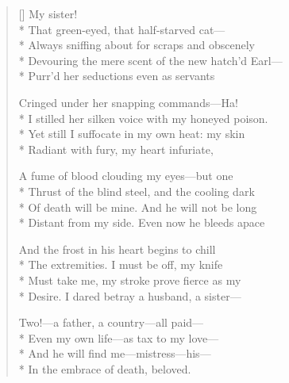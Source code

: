 \label{ch:lear_bm}
\settowidth{\versewidth}{Devouring the mere scent of the new hatch'd Earl---}
\begin{verse}[\versewidth]
\qquad \qquad My sister!\\*
That green-eyed, that half-starved cat---\\*
Always sniffing about for scraps and obscenely\\*
Devouring the mere scent of the new hatch'd Earl---\\*
Purr'd her seductions even as servants

Cringed under her snapping commands---Ha!\\*
I stilled her silken voice with my honeyed poison.\\*
Yet still I suffocate in my own heat: my skin\\*
Radiant with fury, my heart infuriate,

A fume of blood clouding my eyes---but one\\*
Thrust of the blind steel, and the cooling dark\\*
Of death will be mine.  And he will not be long\\*
Distant from my side.  Even now he bleeds apace

And the frost in his heart begins to chill\\*
The extremities.  I must be off, my knife\\*
Must take me, my stroke prove fierce as my\\*
Desire.  I dared betray a husband, a sister---

Two!---a father, a country---all paid---\\*
Even my own life---as tax to my love---\\*
And he will find me---mistress---his---\\*
In the embrace of death, beloved.
\end{verse}
